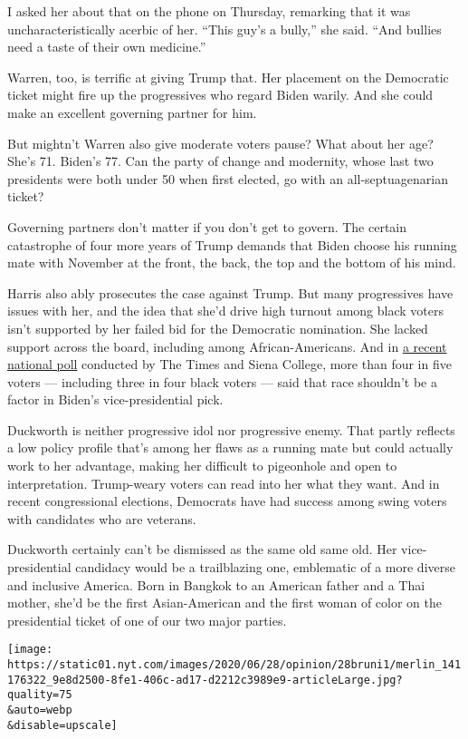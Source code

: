 I asked her about that on the phone on Thursday, remarking that it was
uncharacteristically acerbic of her. ``This guy's a bully,'' she said.
``And bullies need a taste of their own medicine.''

Warren, too, is terrific at giving Trump that. Her placement on the
Democratic ticket might fire up the progressives who regard Biden
warily. And she could make an excellent governing partner for him.

But mightn't Warren also give moderate voters pause? What about her age?
She's 71. Biden's 77. Can the party of change and modernity, whose last
two presidents were both under 50 when first elected, go with an
all-septuagenarian ticket?

Governing partners don't matter if you don't get to govern. The certain
catastrophe of four more years of Trump demands that Biden choose his
running mate with November at the front, the back, the top and the
bottom of his mind.

Harris also ably prosecutes the case against Trump. But many
progressives have issues with her, and the idea that she'd drive high
turnout among black voters isn't supported by her failed bid for the
Democratic nomination. She lacked support across the board, including
among African-Americans. And in
\href{https://www.nytimes.com/2020/06/26/us/politics/biden-vice-president-voters.html}{a
recent national poll} conducted by The Times and Siena College, more
than four in five voters --- including three in four black voters ---
said that race shouldn't be a factor in Biden's vice-presidential pick.

Duckworth is neither progressive idol nor progressive enemy. That partly
reflects a low policy profile that's among her flaws as a running mate
but could actually work to her advantage, making her difficult to
pigeonhole and open to interpretation. Trump-weary voters can read into
her what they want. And in recent congressional elections, Democrats
have had success among swing voters with candidates who are veterans.

Duckworth certainly can't be dismissed as the same old same old. Her
vice-presidential candidacy would be a trailblazing one, emblematic of a
more diverse and inclusive America. Born in Bangkok to an American
father and a Thai mother, she'd be the first Asian-American and the
first woman of color on the presidential ticket of one of our two major
parties.

\texttt{[image: https://static01.nyt.com/images/2020/06/28/opinion/28bruni1/merlin\_141176322\_9e8d2500-8fe1-406c-ad17-d2212c3989e9-articleLarge.jpg?quality=75\\\&auto=webp\\\&disable=upscale]}


